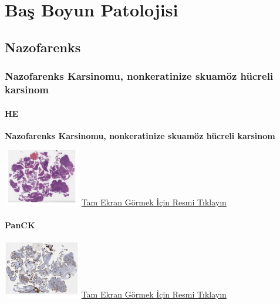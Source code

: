 \documentclass[
  letterpaper,
  DIV=11,
  numbers=noendperiod]{scrreprt}
\begin{document}
\part{Baş Boyun Patolojisi}

\hypertarget{sec-nazofarenks}{%
\chapter{Nazofarenks}\label{sec-nazofarenks}}

\hypertarget{sec-nazofarenks-karsinomu-nonkeratinize-skuamoz-hucreli-karsinom}{%
\section{Nazofarenks Karsinomu, nonkeratinize skuamöz hücreli
karsinom}\label{sec-nazofarenks-karsinomu-nonkeratinize-skuamoz-hucreli-karsinom}}

\hypertarget{he-10}{%
\subsection{HE}\label{he-10}}

\textbf{Nazofarenks Karsinomu, nonkeratinize skuamöz hücreli karsinom}

\href{https://images.patolojiatlasi.com/nasopharynx-nonkeratinizing-scc/HE.html}{\includegraphics[width=0.25\textwidth,height=\textheight]{./screenshots/thumbnail_nasopharynx-nonkeratinizing-scc-HE.png}}
\href{https://images.patolojiatlasi.com/nasopharynx-nonkeratinizing-scc/HE.html}{Tam
Ekran Görmek İçin Resmi Tıklayın}

\hypertarget{panck}{%
\subsection{PanCK}\label{panck}}

\href{https://images.patolojiatlasi.com/nasopharynx-nonkeratinizing-scc/panCK.html}{\includegraphics[width=0.25\textwidth,height=\textheight]{./screenshots/thumbnail_nasopharynx-nonkeratinizing-scc-panCK.png}}
\href{https://images.patolojiatlasi.com/nasopharynx-nonkeratinizing-scc/panCK.html}{Tam
Ekran Görmek İçin Resmi Tıklayın}
\end{document}
